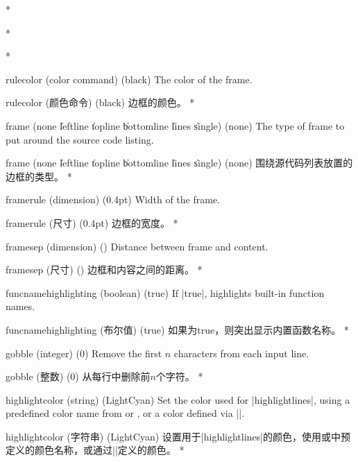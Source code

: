 \begin{optionlist}
\begin{paracol}{2}





\switchcolumn[0]*%

    
\switchcolumn

\switchcolumn[0]*%
  






\switchcolumn[0]*%
\item[rulecolor (color command) (black)]
The color of the frame.
\switchcolumn
\item[rulecolor (颜色命令) (black)]
边框的颜色。
\switchcolumn[0]*%
\item[frame (none \| leftline \| topline \| bottomline \| lines \| single) (none)]
The type of frame to put around the source code listing.
\switchcolumn
\item[frame (none \| leftline \| topline \| bottomline \| lines \| single) (none)]
围绕源代码列表放置的边框的类型。
\switchcolumn[0]*%
\item[framerule (dimension) (0.4pt)]
Width of the frame.
\switchcolumn
\item[framerule (尺寸) (0.4pt)]
边框的宽度。
\switchcolumn[0]*%
  \item[framesep (dimension) (\cmd\fboxsep)]
    Distance between frame and content.
    \switchcolumn
    \item[framesep (尺寸) (\cmd\fboxsep)]
    边框和内容之间的距离。
\switchcolumn[0]*%
  \item[funcnamehighlighting (boolean) (true)] 
    If |true|, highlights built-in function names.
    \switchcolumn
    \item[funcnamehighlighting (布尔值) (true)] 
    如果为true，则突出显示内置函数名称。
\switchcolumn[0]*%
  \item[gobble (integer) (0)]
    Remove the first $n$ characters from each input line.
    \switchcolumn
    \item[gobble (整数) (0)]
    从每行中删除前$n$个字符。
    \switchcolumn[0]*%
\item[highlightcolor (string) (LightCyan)]
Set the color used for |highlightlines|, using a predefined color name from  or , or a color defined via |\definecolor|.
\switchcolumn
\item[highlightcolor (字符串) (LightCyan)]
设置用于|highlightlines|的颜色，使用或中预定义的颜色名称，或通过|\definecolor|定义的颜色。
\switchcolumn[0]*%


\end{paracol}
\end{optionlist}
